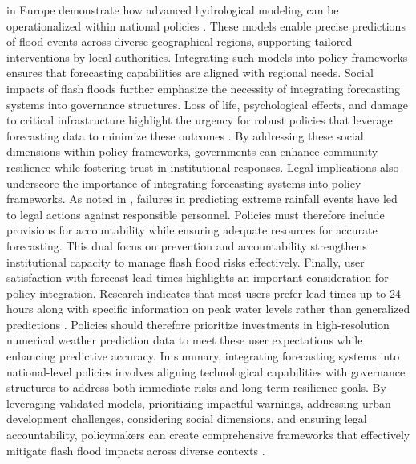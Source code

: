 in Europe demonstrate how advanced hydrological modeling can be operationalized within national policies \citep{Zanchetta2020}. These models enable precise predictions of flood events across diverse geographical regions, supporting tailored interventions by local authorities. Integrating such models into policy frameworks ensures that forecasting capabilities are aligned with regional needs. Social impacts of flash floods further emphasize the necessity of integrating forecasting systems into governance structures. Loss of life, psychological effects, and damage to critical infrastructure highlight the urgency for robust policies that leverage forecasting data to minimize these outcomes \citep{Beilicci2024}. By addressing these social dimensions within policy frameworks, governments can enhance community resilience while fostering trust in institutional responses. Legal implications also underscore the importance of integrating forecasting systems into policy frameworks. As noted in \citep{Silvestro2017}, failures in predicting extreme rainfall events have led to legal actions against responsible personnel. Policies must therefore include provisions for accountability while ensuring adequate resources for accurate forecasting. This dual focus on prevention and accountability strengthens institutional capacity to manage flash flood risks effectively. Finally, user satisfaction with forecast lead times highlights an important consideration for policy integration. Research indicates that most users prefer lead times up to 24 hours along with specific information on peak water levels rather than generalized predictions \citep{Philipp2016}. Policies should therefore prioritize investments in high-resolution numerical weather prediction data to meet these user expectations while enhancing predictive accuracy. In summary, integrating forecasting systems into national-level policies involves aligning technological capabilities with governance structures to address both immediate risks and long-term resilience goals. By leveraging validated models, prioritizing impactful warnings, addressing urban development challenges, considering social dimensions, and ensuring legal accountability, policymakers can create comprehensive frameworks that effectively mitigate flash flood impacts across diverse contexts \citep{Jubach2016}\citep{Henderson2020}\citep{Kastridis2020}\citep{Beilicci2024}.

